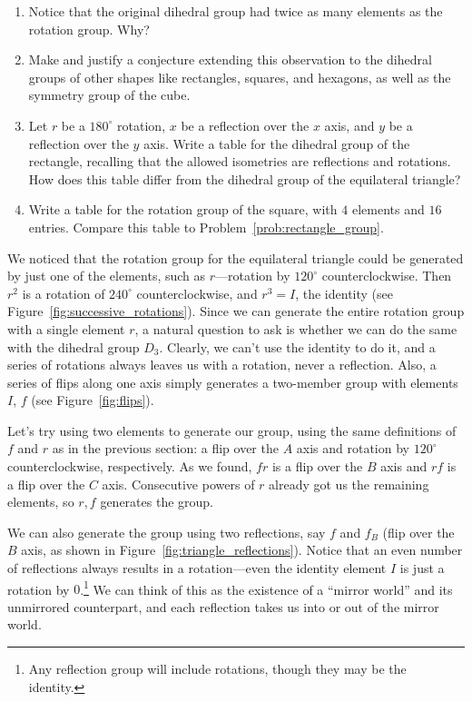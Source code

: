 \documentclass[../textbook.tex]{subfiles}
\begin{document}
\begin{enumerate}
\item Notice that the original dihedral group had twice as many elements as the rotation group. Why?
\item Make and justify a conjecture extending this observation to the dihedral groups of other shapes like rectangles, squares, and hexagons, as well as the symmetry group of the cube.
\item Let $r$ be a $180^{\circ}$ rotation, $x$ be a reflection over the $x$ axis, and $y$ be a reflection over the $y$ axis. Write a table for the dihedral group of the rectangle, recalling that the allowed isometries are reflections and rotations. How does this table differ from the dihedral group of the equilateral triangle? \label{prob:rectangle_group}
\item Write a table for the rotation group of the square, with $4$ elements and $16$ entries. Compare this table to Problem~\ref{prob:rectangle_group}.
\setcounter{rrg_problem_i}{\value{enumi}}
\end{enumerate}

\noindent We noticed that the rotation group for the equilateral triangle could be generated by just one of the elements, such as $r$---rotation by $120^{\circ}$ counterclockwise. Then $r^2$ is a rotation of $240^{\circ}$ counterclockwise, and $r^3=I$, the identity (see Figure~\ref{fig:successive_rotations}). Since we can generate the entire rotation group with a single element $r$, a natural question to ask is whether we can do the same with the dihedral group $D_3$. Clearly, we can't use the identity to do it, and a series of rotations always leaves us with a rotation, never a reflection. Also, a series of flips along one axis simply generates a two-member group with elements $I$, $f$ (see Figure~\ref{fig:flips}).

Let's try using two elements to generate our group, using the same definitions of $f$ and $r$ as in the previous section: a flip over the $A$ axis and rotation by $120^{\circ}$ counterclockwise, respectively. As we found, $fr$ is a flip over the $B$ axis and $rf$ is a flip over the $C$ axis. Consecutive powers of $r$ already got us the remaining elements, so ${r,f}$ generates the group.

We can also generate the group using two reflections, say $f$ and $f_B$ (flip over the $B$ axis, as shown in Figure~\ref{fig:triangle_reflections}). Notice that an even number of reflections always results in a rotation---even the identity element $I$ is just a rotation by $0$.\footnote{Any reflection group will include rotations, though they may be the identity.} We can think of this as the existence of a ``mirror world'' and its unmirrored counterpart, and each reflection takes us into or out of the mirror world.
\end{document}
